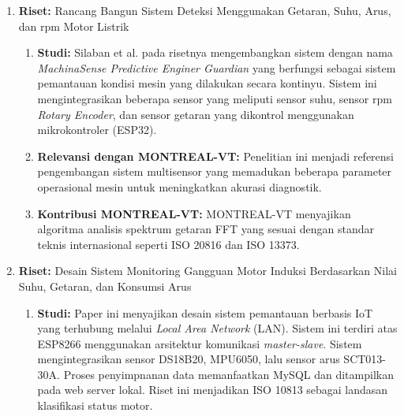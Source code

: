 \documentclass{elsinta}
\begin{document}
\begin{enumerate}
\begin{enumerate}
        \item \textbf{Relevansi dengan MONTREAL-VT:} Penelitian ini menjadi referensi dalam implementasi pemrosesan data domain waktu menjadi domain frekuensi secara \textit{real-time} dengan mengacu pada standar ISO 13373 dan ISO 20816, implementasi protokol komunikasi IoT, serta model klasifikasi keparahan getaran dengan mengacu pada ISO 20816 sebagai dasar evaluasi tingkat keparahan getaran pada sistem pemantauan kondisi mesin.
        \item \textbf{Kontribusi MONTREAL-VT:} MONTREAL-VT menerapkan pemrosesan sinyal getaran seperti pemfilteran, penguatan, dan konversi data getaran domain waktu ke domain frekuensi yang diintegrasikan model klasifikasi keparahan getaran ISO 20816-1:2016.
    \end{enumerate}
    \item \textbf{Riset:} Rancang Bangun Sistem Deteksi Menggunakan Getaran, Suhu, Arus, dan rpm Motor Listrik\cite{Silaban2026}
    \begin{enumerate}
        \item \textbf{Studi:} Silaban et al. pada risetnya mengembangkan sistem dengan nama \textit{MachinaSense Predictive Enginer Guardian} yang berfungsi sebagai sistem pemantauan kondisi mesin yang dilakukan secara kontinyu. Sistem ini mengintegrasikan beberapa sensor yang meliputi sensor suhu, sensor rpm \textit{Rotary Encoder}, dan sensor getaran yang dikontrol menggunakan mikrokontroler (ESP32).
        \item \textbf{Relevansi dengan MONTREAL-VT:} Penelitian ini menjadi referensi pengembangan sistem multisensor yang memadukan beberapa parameter operasional mesin untuk meningkatkan akurasi diagnostik.
        \item \textbf{Kontribusi MONTREAL-VT:} MONTREAL-VT menyajikan algoritma analisis spektrum getaran FFT yang sesuai dengan standar teknis internasional seperti ISO 20816 dan ISO 13373.
    \end{enumerate}
    \item \textbf{Riset:} Desain Sistem Monitoring Gangguan Motor Induksi Berdasarkan Nilai Suhu, Getaran, dan Konsumsi Arus\cite{Yusro2025}
    \begin{enumerate}
        \item \textbf{Studi:} Paper ini menyajikan desain sistem pemantauan berbasis IoT yang terhubung melalui \textit{Local Area Network }(LAN). Sistem ini terdiri atas ESP8266 menggunakan arsitektur komunikasi \textit{master-slave}. Sistem mengintegrasikan sensor DS18B20, MPU6050, lalu sensor arus SCT013-30A. Proses penyimpnanan data memanfaatkan MySQL dan ditampilkan pada web server lokal. Riset ini menjadikan ISO 10813 sebagai landasan klasifikasi status motor.

\end{enumerate}
\end{enumerate}
\end{document}
